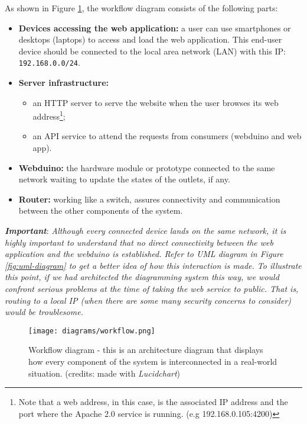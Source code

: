 As shown in Figure \ref{fig:workflow-diagram}, the workflow diagram consists of the following parts:
\begin{itemize}
    \item \textbf{Devices accessing the web application:} a user can use smartphones or desktops (laptops) to access and load the web application. This end-user device should be connected to the local area network (LAN) with this IP: \texttt{192.168.0.0/24}.
    \item \textbf{Server infrastructure:}
    \begin{itemize}
        \item an HTTP server to serve the website when the user browses its web
        address\footnote{Note that a web address, in this case, is the associated
        IP address and the port where the Apache 2.0 service is running. (e.g
        192.168.0.105:4200)};
        \item an API service to attend the requests from consumers (webduino and web app).
    \end{itemize}
    \item \textbf{Webduino:} the hardware module or prototype connected to the same network waiting to update the states of the outlets, if any.
    \item \textbf{Router:} working like a switch, assures connectivity and communication between the other components of the system.
\end{itemize}

\textbf{\textit{Important}}: \textit{Although every connected device lands on the same network, it is highly important to understand that no direct connectivity between the web application and the webduino is established. Refer to UML diagram in Figure \ref{fig:uml-diagram} to get a better idea of how this interaction is made. To illustrate this point, if we had architected the diagramming system this way, we would confront serious problems at the time of taking the web service to public. That is, routing to a local IP (when there are some many security concerns to consider) would be troublesome.}

\begin{figure}[ht!]
    \centering
    \texttt{[image: diagrams/workflow.png]}
    \caption{Workflow diagram - this is an architecture diagram that displays how every component of the system is interconnected in a real-world situation. (credits: made with \emph{Lucidchart})}
    \label{fig:workflow-diagram}
\end{figure}

